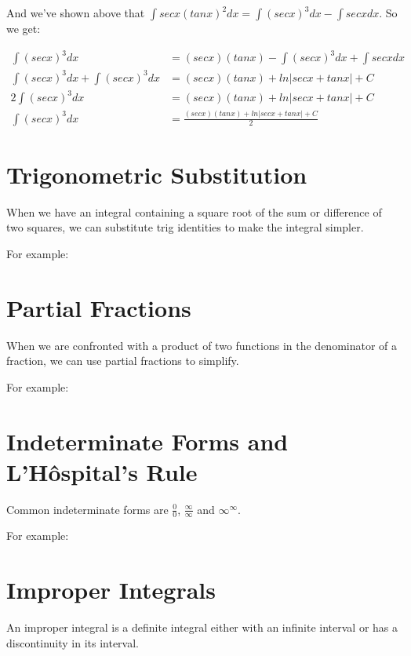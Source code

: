 \documentclass{article}
\newenvironment{correction}
{\color{green}}
{}
\begin{document}
And we've shown \begin{correction}above\end{correction} that $\int secx (tanx)^2 dx = \int (secx)^3 dx -
\int secx dx$.  So we get:

\begin{align*}
  \int (secx)^3 dx &= (secx)(tanx) - \int (secx)^3 dx + \int secx dx \\
  \int (secx)^3 dx + \int (secx)^3 dx &=
  (secx)(tanx) + ln \left| secx + tanx \right| + C \\
  2 \int (secx)^3 dx &= (secx)(tanx) + ln \left| secx + tanx \right| + C \\
  \int (secx)^3 dx &= \frac{(secx)(tanx) + ln \left| secx + tanx \right| + C}{2}
\end{align*}

\section{Trigonometric Substitution}

When we have an integral containing a square root of the sum \begin{correction}or difference\end{correction} of two
squares, we can substitute trig identities to make the integral simpler.

For example:

\section{Partial Fractions}

When we are confronted with a product of two functions in the
denominator of a fraction, we can use partial fractions to simplify.

For example:

\section{Indeterminate Forms and L'H\^{o}spital's Rule}

Common indeterminate forms are $\frac{0}{0}$, $\frac{\infty}{\infty}$
and $\infty^\infty$.

For example:

\section{Improper Integrals}

An improper integral is a definite integral either with an infinite
interval or has a discontinuity in its interval.
\end{document}
